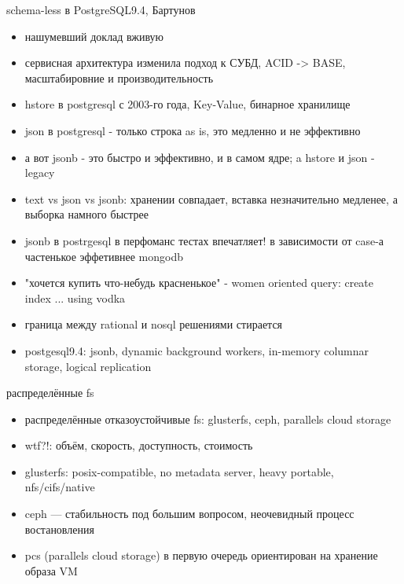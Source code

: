 \documentclass[aspectratio=169]{beamer}
\begin{document}
\begin{frame}{schema-less в PostgreSQL9.4, Бартунов}
\begin{itemize}
  \item нашумевший доклад вживую
  \item сервисная архитектура изменила подход к СУБД, ACID -> BASE, масштабировние и производительность
  \item hstore в postgresql с 2003-го года, Key-Value, бинарное хранилище
  \item json в postgresql - только строка as is, это медленно и не эффективно
  \item а вот jsonb - это быстро и эффективно, и в самом ядре; a hstore и json - legacy
  \item text vs json vs jsonb: хранении совпадает, вставка незначительно медленее, а выборка намного быстрее
  \item jsonb в postrgesql в перфоманс тестах впечатляет! в зависимости от case-а частенькое эффетивнее mongodb
  \item "хочется купить что-небудь красненькое" - women oriented query: create index ... using vodka
  \item граница между rational и nosql решениями стирается
  \item postgesql9.4: jsonb, dynamic background workers, in-memory columnar storage, logical replication
\end{itemize}
\end{frame}
  
\begin{frame}{распределённые fs}
\begin{itemize}
  \item распределённые отказоустойчивые fs: glusterfs, ceph, parallels cloud storage
  \item wtf?!: объём, скорость, доступность, стоимость
  \item glusterfs: posix-compatible, no metadata server, heavy portable, nfs/cifs/native
  \item ceph --- стабильность под большим вопросом, неочевидный процесс востановления
  \item pcs (parallels cloud storage) в первую очередь ориентирован на хранение образа VM
\end{itemize}
\end{frame}
  
\end{document}
